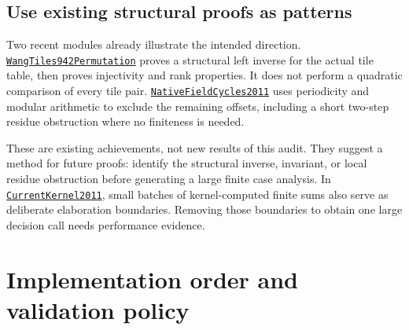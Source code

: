 \documentclass[11pt,letterpaper]{article}
\newcommand{\src}[1]{\href{https://github.com/VladimirReshetnikov/ProveIt/blob/60e9c5d620c6c387d932876cfa2d9376f64ea56c/Computability/DiophantineConsistency/Lean/DiophantineConsistency/#1.lean}{\texttt{#1}}}
\begin{document}
\subsection{Use existing structural proofs as patterns}

Two recent modules already illustrate the intended direction.
\src{WangTiles942Permutation} proves a structural left inverse for the actual
tile table, then proves injectivity and rank properties. It does not perform a
quadratic comparison of every tile pair. \src{NativeFieldCycles2011} uses
periodicity and modular arithmetic to exclude the remaining offsets, including
a short two-step residue obstruction where no finiteness is needed.

These are existing achievements, not new results of this audit. They suggest a
method for future proofs: identify the structural inverse, invariant, or local
residue obstruction before generating a large finite case analysis. In
\src{CurrentKernel2011}, small batches of kernel-computed finite sums also serve
as deliberate elaboration boundaries. Removing those boundaries to obtain one
large decision call needs performance evidence.

\section{Implementation order and validation policy}
\end{document}
